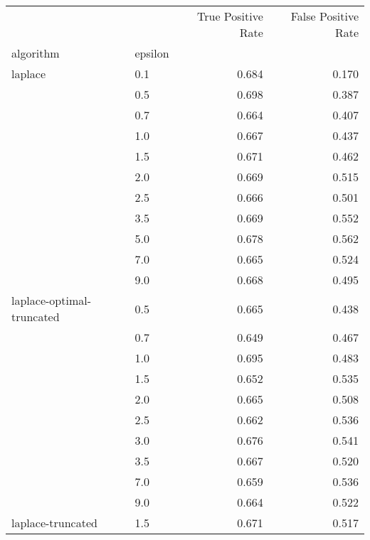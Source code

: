 \begin{tabular}{llrr}
\toprule
          &     &  True Positive Rate &  False Positive Rate \\
algorithm & epsilon &                     &                      \\
\midrule
laplace & 0.1 &               0.684 &                0.170 \\
          & 0.5 &               0.698 &                0.387 \\
          & 0.7 &               0.664 &                0.407 \\
          & 1.0 &               0.667 &                0.437 \\
          & 1.5 &               0.671 &                0.462 \\
          & 2.0 &               0.669 &                0.515 \\
          & 2.5 &               0.666 &                0.501 \\
          & 3.5 &               0.669 &                0.552 \\
          & 5.0 &               0.678 &                0.562 \\
          & 7.0 &               0.665 &                0.524 \\
          & 9.0 &               0.668 &                0.495 \\
laplace-optimal-truncated & 0.5 &               0.665 &                0.438 \\
          & 0.7 &               0.649 &                0.467 \\
          & 1.0 &               0.695 &                0.483 \\
          & 1.5 &               0.652 &                0.535 \\
          & 2.0 &               0.665 &                0.508 \\
          & 2.5 &               0.662 &                0.536 \\
          & 3.0 &               0.676 &                0.541 \\
          & 3.5 &               0.667 &                0.520 \\
          & 7.0 &               0.659 &                0.536 \\
          & 9.0 &               0.664 &                0.522 \\
laplace-truncated & 1.5 &               0.671 &                0.517 \\

\end{tabular}
